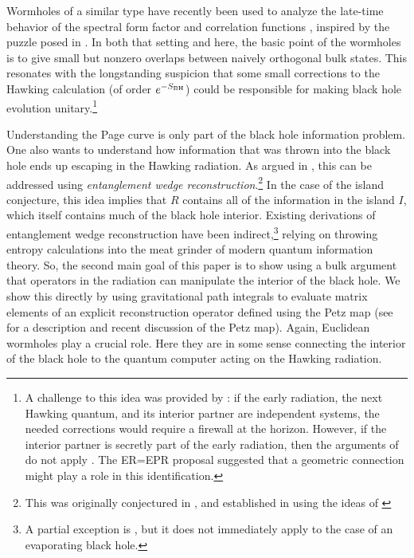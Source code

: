 \documentclass[12pt]{article}
\numberwithin{equation}{section}
\begin{document}
Wormholes of a similar type have recently been used to analyze the late-time behavior of the spectral form factor \cite{Saad:2018bqo,Saad:2019lba} and correlation functions \cite{Saad:2019pqd}, inspired by the puzzle posed in \cite{Maldacena:2001kr}. In both that setting and here, the basic point of the wormholes is to give small but nonzero overlaps between naively orthogonal bulk states. This resonates with the longstanding suspicion that some small corrections to the Hawking calculation (of order $e^{-S_{\rm BH}}$) could be responsible for making black hole evolution unitary.\footnote{A challenge to this idea was provided by \cite{Mathur:2009hf,Almheiri:2012rt}: if the early radiation, the next Hawking quantum, and its interior partner are independent systems, the needed corrections would require a firewall at the horizon. However, if the interior partner is secretly part of the early radiation, then the arguments of \cite{Mathur:2009hf,Almheiri:2012rt} do not apply \cite{Bousso:2012as,Nomura:2012sw,Verlinde:2012cy,Papadodimas:2012aq,Maldacena:2013xja}. The ER=EPR proposal \cite{Maldacena:2013xja} suggested that a geometric connection might play a role in this identification.}

Understanding the Page curve is only part of the black hole information problem. One also wants to understand how information that was thrown into the black hole ends up escaping in the Hawking radiation. As argued in \cite{Penington:2019npb,Almheiri:2019psf}, this can be addressed using \emph{entanglement wedge reconstruction}.\footnote{This was originally conjectured in \cite{Headrick:2014cta,Czech:2012bh,Wall:2012uf}, and established in \cite{Jafferis:2015del,Dong:2016eik,Cotler:2017erl} using the ideas of \cite{Faulkner:2013ana}} In the case of the island conjecture, this idea implies that $R$ contains all of the information in the island $I$, which itself contains much of the black hole interior. Existing derivations of entanglement wedge reconstruction have been indirect,\footnote{A partial exception is \cite{Faulkner:2017vdd}, but it does not immediately apply to the case of an evaporating black hole.} relying on throwing entropy calculations into the meat grinder of modern  quantum information theory. So, the second main goal of this paper is to show using a bulk argument that operators in the radiation can manipulate the interior of the black hole. We show this directly by using gravitational path integrals to evaluate matrix elements of an explicit reconstruction operator defined using the Petz map \cite{petz1986sufficient,petz1988sufficiency} (see \cite{Cotler:2017erl,chen2019entanglement} for a description and recent discussion of the Petz map). Again, Euclidean wormholes play a crucial role. Here they are in some sense connecting the interior of the black hole to the quantum computer acting on the Hawking radiation.
\end{document}
